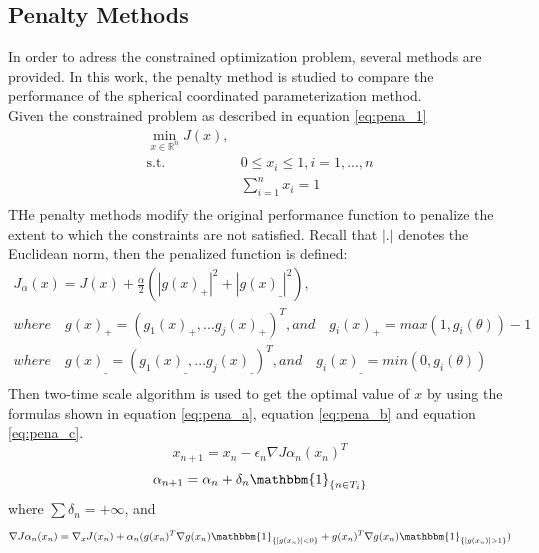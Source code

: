 \documentclass[a4paper,12pt]{article}
\begin{document}
\subsection{Penalty Methods}
In order to adress the constrained optimization problem, several methods are provided. In this work, the penalty method is studied to compare the performance of the spherical coordinated parameterization method.\\
Given the constrained problem as described in equation \ref{eq:pena_1}
\begin{equation}\label{eq:pena_1}
\begin{aligned}
\min_{x\in \mathbb{R}^n}J(x), \\
\textrm{s.t.} \quad & 0 \leq x_i \leq 1, i=1,...,n\\
              \quad & \sum_{i=1}^{n} x_i = 1\\
\end{aligned}
\end{equation}
THe penalty methods modify the original performance function to penalize the extent to which the constraints are not satisfied. Recall that $|.|$ denotes the Euclidean norm, then the penalized function is defined:\\
\begin{equation} \label{eq:pena_2}
\begin{aligned}
J_{\alpha}(x) = J(x)+\frac{\alpha}{2}(|g(x)_{+}|^2+|g(x)_{\_}|^2),\\
where \quad g(x)_{+} =(g_1(x)_{+},...g_j(x)_{+})^T, and \quad g_i(x)_{+} = max(1,g_i(\theta))-1\\
where \quad g(x)_{\_} =(g_1(x)_{\_},...g_j(x)_{\_})^T, and \quad g_i(x)_{\_} = min(0,g_i(\theta))\\
\end{aligned}
\end{equation}
Then two-time scale algorithm is used to get the optimal value of $x$ by using the formulas shown in equation \ref{eq:pena_a}, equation \ref{eq:pena_b} and equation \ref{eq:pena_c}. \\
\begin{equation} \label{eq:pena_a}
x_{n+1}=x_n-\epsilon _n \nabla J{\alpha_ n}(x_n)^T
\end{equation}
\begin{equation}\label{eq:pena_b}
\alpha_{n+1}=\alpha_n+\delta _n \mathbbm{1} _{\{n\in {T_i}\}}
\end{equation}
where $\sum \delta_n = + \infty$, and\\
\begin{equation}\label{eq:pena_c}
\nabla J{\alpha_ n}(x_n) =\nabla _x J(x_n)+\alpha_n(g(x_n)^T \nabla g(x_n) \mathbbm{1}_{\{|g(x_n)|<0\}}+g(x_n)^T \nabla g(x_n) \mathbbm{1}_{\{|g(x_n)|>1\}})
\end{equation}
\end{document}
